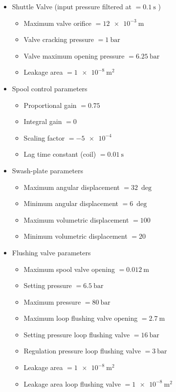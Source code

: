\documentclass[12pt,a4paper,oneside]{book}
\begin{document}
\begin{onehalfspace}
{\begin{itemize}
\begin{itemize}
			\item  Setting pressure $=\SI{390}{\bar}$
			\item  Maximum pressure $=\SI{450}{\bar}$
			\item Leakage area $=\SI{1e-8}{\square\meter}$
		\end{itemize}
		\item Shuttle Valve (input pressure filtered at $=\SI{0.1}{\second}$ )
		\begin{itemize}		
			\item  Maximum valve orifice $=\SI{12e-3}{\meter}$
			\item  Valve cracking pressure $=\SI{1}{\bar}$
			\item  Valve maximum opening pressure $=\SI{6.25}{\bar}$
			\item Leakage area $=\SI{1e-8}{\square\meter}$
		\end{itemize}
		\item Spool control parameters
		\begin{itemize}
			\item Proportional gain $=0.75$
			\item Integral gain $=0$			
			\item Scaling factor $=\SI{-5e-4}{}$
			\item Lag time constant (coil) $=\SI{0.01}{\second}$
		\end{itemize}
		\item Swash-plate parameters
		\begin{itemize}
			\item Maximum angular displacement $=\SI{32}{\deg}$
			\item Minimum angular displacement $=\SI{6}{\deg}$
			\item Maximum volumetric displacement $=\SI{100}{}$
			\item Minimum volumetric displacement $=\SI{20}{}$
		\end{itemize}
		\item Flushing valve parameters
		\begin{itemize}
			\item Maximum spool valve opening $=\SI{0.012}{\meter}$
			\item Setting pressure $=\SI{6.5}{\bar}$
			\item Maximum pressure $=\SI{80}{\bar}$
			\item Maximum loop flushing valve opening $=\SI{2.7}{\meter}$
			\item Setting pressure loop flushing valve $=\SI{16}{\bar}$
			\item Regulation pressure loop flushing valve $=\SI{3}{\bar}$
			\item Leakage area $=\SI{1e-8}{\square\meter}$
			\item Leakage area loop flushing valve $=\SI{1e-8}{\square\meter}$
		\end{itemize}
	\end{itemize}
}


\end{onehalfspace}
\end{document}
